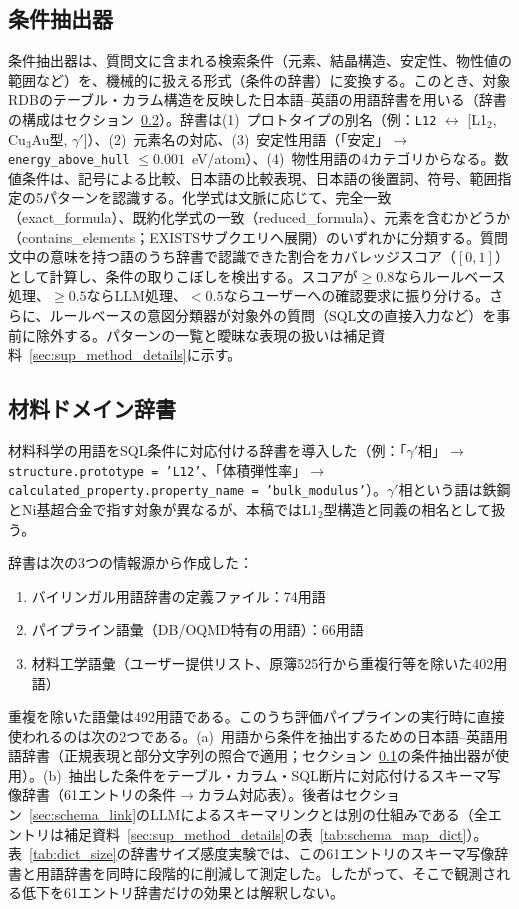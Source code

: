 \documentclass[twocolumn]{interact}
\begin{document}
\subsection{条件抽出器}
\label{sec:entity_extractor}
\label{sec:coverage_score}
\label{sec:intent_classifier}

条件抽出器は、質問文に含まれる検索条件（元素、結晶構造、安定性、物性値の範囲など）を、機械的に扱える形式（条件の辞書）に変換する。このとき、対象RDBのテーブル・カラム構造を反映した日本語--英語の用語辞書を用いる（辞書の構成はセクション~\ref{sec:domain_dict}）。辞書は(1)~プロトタイプの別名（例：\texttt{L12} $\leftrightarrow$ [L1$_2$, Cu$_3$Au型, $\gamma'$]）、(2)~元素名の対応、(3)~安定性用語（「安定」$\to$ \texttt{energy\_above\_hull} $\leq 0.001$~eV/atom）、(4)~物性用語の4カテゴリからなる。数値条件は、記号による比較、日本語の比較表現、日本語の後置詞、符号、範囲指定の5パターンを認識する。化学式は文脈に応じて、完全一致（exact\_formula）、既約化学式の一致（reduced\_formula）、元素を含むかどうか（contains\_elements；EXISTSサブクエリへ展開）のいずれかに分類する。質問文中の意味を持つ語のうち辞書で認識できた割合をカバレッジスコア（$[0,1]$）として計算し、条件の取りこぼしを検出する。スコアが$\geq 0.8$ならルールベース処理、$\geq 0.5$ならLLM処理、$< 0.5$ならユーザーへの確認要求に振り分ける。さらに、ルールベースの意図分類器が対象外の質問（SQL文の直接入力など）を事前に除外する。パターンの一覧と曖昧な表現の扱いは補足資料~\ref{sec:sup_method_details}に示す。

\subsection{材料ドメイン辞書}
\label{sec:domain_dict}

材料科学の用語をSQL条件に対応付ける辞書を導入した（例：「$\gamma'$相」$\to$ \texttt{structure.prototype = 'L12'}、「体積弾性率」$\to$ \texttt{calculated\_property.property\_name = 'bulk\_modulus'}）。$\gamma'$相という語は鉄鋼とNi基超合金で指す対象が異なるが、本稿ではL1$_2$型構造と同義の相名として扱う。

辞書は次の3つの情報源から作成した：
\begin{enumerate}
  \item バイリンガル用語辞書の定義ファイル：74用語
  \item パイプライン語彙（DB/OQMD特有の用語）：66用語
  \item 材料工学語彙（ユーザー提供リスト、原簿525行から重複行等を除いた402用語）
\end{enumerate}
重複を除いた語彙は492用語である。このうち評価パイプラインの実行時に直接使われるのは次の2つである。(a)~用語から条件を抽出するための日本語--英語用語辞書（正規表現と部分文字列の照合で適用；セクション~\ref{sec:entity_extractor}の条件抽出器が使用）。(b)~抽出した条件をテーブル・カラム・SQL断片に対応付けるスキーマ写像辞書（61エントリの条件$\to$カラム対応表）。後者はセクション~\ref{sec:schema_link}のLLMによるスキーマリンクとは別の仕組みである（全エントリは補足資料~\ref{sec:sup_method_details}の表~\ref{tab:schema_map_dict}）。表~\ref{tab:dict_size}の辞書サイズ感度実験では、この61エントリのスキーマ写像辞書と用語辞書を同時に段階的に削減して測定した。したがって、そこで観測される低下を61エントリ辞書だけの効果とは解釈しない。
\end{document}
